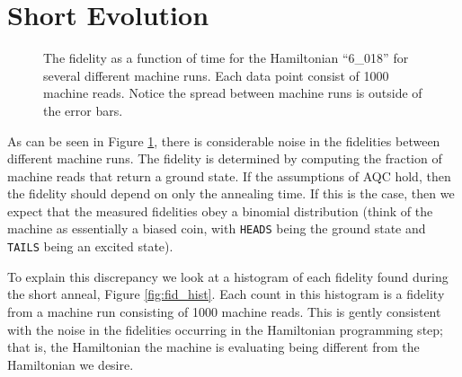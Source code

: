\documentclass[12pt]{dalthesis}
\begin{document}
\section{Short Evolution}
\begin{figure}
	\caption[Short Time Fidelities]{The fidelity as a function of time for the Hamiltonian ``6\_018'' for several different machine runs.  Each data point consist of 1000 machine reads.  Notice the spread between machine runs is outside of the error bars.}
	\label{fig:short_fidelity}
\end{figure}
As can be seen in Figure \ref{fig:short_fidelity}, there is considerable noise in the fidelities between different machine runs.  The fidelity is determined by computing the fraction of machine reads that return a ground state.  If the assumptions of AQC hold, then the fidelity should depend on only the annealing time.  If this is the case, then we expect that the measured fidelities obey a binomial distribution (think of the machine as essentially a biased coin, with \texttt{HEADS} being the ground state and \texttt{TAILS} being an excited state).  

To explain this discrepancy we look at a histogram of each fidelity found during the short anneal, Figure \ref{fig:fid_hist}.  Each count in this histogram is a fidelity from a machine run consisting of 1000 machine reads.  This is gently consistent with the noise in the fidelities occurring in the Hamiltonian programming step; that is, the Hamiltonian the machine is evaluating being different from the Hamiltonian we desire.
\end{document}
